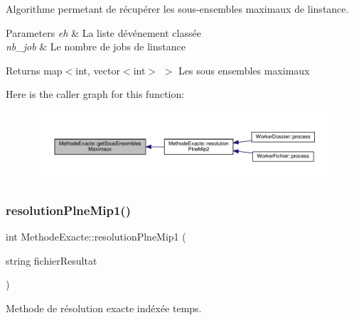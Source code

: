 Algorithme permetant de récupérer les sous-\/ensembles maximaux de l\textquotesingle{}instance. 


\begin{DoxyParams}{Parameters}
{\em eh} & La liste d\textquotesingle{}événement classée \\
\hline
{\em nb\+\_\+job} & Le nombre de jobs de l\textquotesingle{}instance \\
\hline
\end{DoxyParams}
\begin{DoxyReturn}{Returns}
map$<$int, vector$<$int$>$ $>$ Les sous ensembles maximaux 
\end{DoxyReturn}
Here is the caller graph for this function\+:\nopagebreak
\begin{figure}[H]
\begin{center}
\leavevmode
\includegraphics[width=350pt]{classMethodeExacte_a10f398a3e3c163f7fc9b45f48f916f98_icgraph}
\end{center}
\end{figure}
\mbox{\label{classMethodeExacte_a202241adc56888d12cf6769a6cab5412}} 
\subsubsection{\texorpdfstring{resolution\+Plne\+Mip1()}{resolutionPlneMip1()}}
{\footnotesize\ttfamily int Methode\+Exacte\+::resolution\+Plne\+Mip1 (\begin{DoxyParamCaption}\item[{string}]{fichier\+Resultat }\end{DoxyParamCaption})}



Methode de résolution exacte indéxée temps. 


